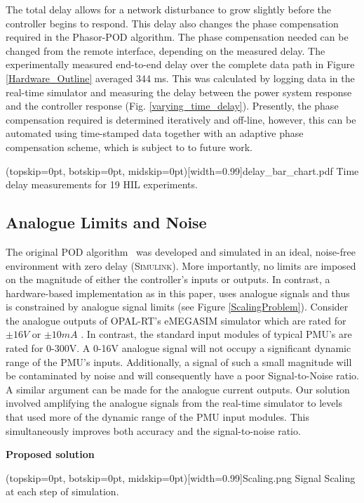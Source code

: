 \documentclass{ieeeaccess}
\begin{document}
The total delay allows for a network disturbance to grow slightly before the controller begins to respond. This delay also changes the phase compensation required in the Phasor-POD algorithm. The phase compensation needed can be changed from the remote interface, depending on the measured delay. The experimentally measured end-to-end delay over the complete data path in Figure \ref{Hardware_Outline} averaged 344 ms. This was calculated by logging data in the real-time simulator and measuring the delay between the power system response and the controller response (Fig. \ref{varying_time_delay}). Presently, the phase compensation required is determined iteratively and off-line, however, this can be automated using time-stamped data together with an adaptive phase compensation scheme, which is subject to to future work.

\Figure[tbph](topskip=0pt, botskip=0pt, midskip=0pt)[width=0.99\columnwidth]{delay_bar_chart.pdf}
{Time delay measurements for 19 HIL experiments.\label{varying_time_delay}}


\subsection{Analogue Limits and Noise}
The original POD algorithm~\cite{PhasorPOD} was developed and simulated in an ideal, noise-free environment with zero delay (\textsc{Simulink}). More importantly, no limits are imposed on the magnitude of either the controller's inputs or outputs. In contrast, a hardware-based implementation as in this paper, uses analogue signals and thus is constrained by analogue signal limits (see Figure \ref{ScalingProblem}). Consider the analogue outputs of OPAL-RT's eMEGASIM simulator which are rated for $\pm16V$ or $\pm10mA$  \cite{eMEGASIM}. In contrast, the standard input modules of typical PMU's are rated for 0-300V. A 0-16V analogue signal will not occupy a significant dynamic range of the PMU\rq{}s inputs. Additionally, a signal of such a small magnitude will be contaminated by noise and will consequently have a poor Signal-to-Noise ratio. A similar argument can be made for the analogue current outputs. Our solution involved amplifying the analogue signals from the real-time simulator to levels that used more of the dynamic range of the PMU input modules. This simultaneously improves both accuracy and the signal-to-noise ratio.

\textbf{Proposed solution}

\Figure[tbp!](topskip=0pt, botskip=0pt, midskip=0pt)[width=0.99\columnwidth]{Scaling.png}
{Signal Scaling at each step of simulation.\label{ScalingProblem}}
\end{document}
